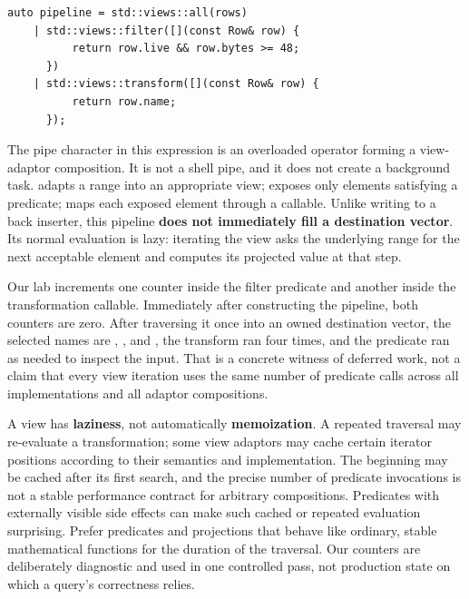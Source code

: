 \begin{verbatim}
auto pipeline = std::views::all(rows)
    | std::views::filter([](const Row& row) {
          return row.live && row.bytes >= 48;
      })
    | std::views::transform([](const Row& row) {
          return row.name;
      });
\end{verbatim}

The pipe character in this expression is an overloaded operator forming a view-adaptor composition. It is not a shell pipe, and it does not create a background task.  adapts a range into an appropriate view;  exposes only elements satisfying a predicate;  maps each exposed element through a callable. Unlike  writing to a back inserter, this pipeline \textbf{does not immediately fill a destination vector}. Its normal evaluation is lazy: iterating the view asks the underlying range for the next acceptable element and computes its projected value at that step.

Our lab increments one counter inside the filter predicate and another inside the transformation callable. Immediately after constructing the pipeline, both counters are zero. After traversing it once into an owned destination vector, the selected names are , ,  and , the transform ran four times, and the predicate ran as needed to inspect the input. That is a concrete witness of deferred work, not a claim that every view iteration uses the same number of predicate calls across all implementations and all adaptor compositions.

A view has \textbf{laziness}, not automatically \textbf{memoization}. A repeated traversal may re-evaluate a transformation; some view adaptors may cache certain iterator positions according to their semantics and implementation. The  beginning may be cached after its first search, and the precise number of predicate invocations is not a stable performance contract for arbitrary compositions. Predicates with externally visible side effects can make such cached or repeated evaluation surprising. Prefer predicates and projections that behave like ordinary, stable mathematical functions for the duration of the traversal. Our counters are deliberately diagnostic and used in one controlled pass, not production state on which a query's correctness relies.

